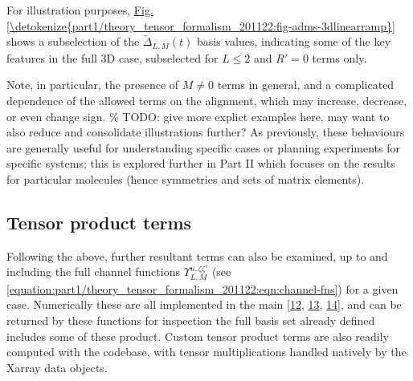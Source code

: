 \documentclass[letterpaper,table,10pt,english]{jupyterBook}
\begin{document}
\sphinxAtStartPar
For illustration purposes, \hyperref[\detokenize{part1/theory_tensor_formalism_201122:fig-adms-3dlinearramp}]{Fig.\@ \ref{\detokenize{part1/theory_tensor_formalism_201122:fig-adms-3dlinearramp}}} shows a subselection of the \(\tilde{\Delta}_{L,M}(t)\) basis values, indicating some of the key features in the full 3D case, subselected for \(L\leq2\) and \(R'=0\) terms only.

\sphinxAtStartPar
Note, in particular, the presence of \(M\neq0\) terms in general, and a complicated dependence of the allowed terms on the alignment, which may increase, decrease, or even change sign. \% TODO: give more explict examples here, may want to also reduce and consolidate illustrations further?
As previously, these behaviours are generally useful for understanding specific cases or planning experiments for specific systems; this is explored further in Part II which focuses on the results for particular molecules (hence symmetries and sets of matrix elements).


\subsection{Tensor product terms}
\label{\detokenize{part1/theory_tensor_formalism_201122:tensor-product-terms}}\label{\detokenize{part1/theory_tensor_formalism_201122:sec-theory-tensor-products}}
\sphinxAtStartPar
Following the above, further resultant terms can also be examined, up to and including the full channel functions \(\varUpsilon_{L,M}^{u,\zeta\zeta'}\) (see \eqref{equation:part1/theory_tensor_formalism_201122:eqn:channel-fns}) for a given case. Numerically these are all implemented in the main  {[}\hyperlink{cite.backmatter/bibliography:id561}{12}, \hyperlink{cite.backmatter/bibliography:id508}{13}, \hyperlink{cite.backmatter/bibliography:id506}{14}{]}, and can be returned by these functions for inspection \sphinxhyphen{} the full basis set already defined includes some of these product. Custom tensor product terms are also readily computed with the codebase, with tensor multiplications handled natively by the Xarray data objects.
\end{document}
